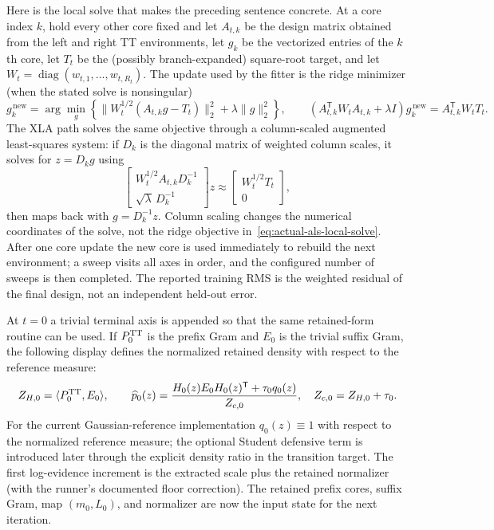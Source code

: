 \documentclass[11pt]{article}
\begin{document}
Here is the local solve that makes the preceding sentence concrete.  At a
core index $k$, hold every other core fixed and let $A_{t,k}$ be the design
matrix obtained from the left and right TT environments, let $g_k$ be the
vectorized entries of the $k$th core, let $T_t$ be the (possibly
branch-expanded) square-root target, and let
$W_t=\operatorname{diag}(w_{t,1},\ldots,w_{t,R_t})$.  The update used by the
fitter is the ridge minimizer (when the stated solve is nonsingular)
\begin{equation}
  g_k^{\,\mathrm{new}}
  =\arg\min_g\left\{
       \lVert W_t^{1/2}(A_{t,k}g-T_t)\rVert_2^2
       +\lambda\lVert g\rVert_2^2\right\},
  \qquad
  (A_{t,k}^{\mathsf T}W_tA_{t,k}+\lambda I)g_k^{\,\mathrm{new}}
  =A_{t,k}^{\mathsf T}W_tT_t.
  \label{eq:actual-als-local-solve}
\end{equation}
The XLA path solves the same objective through a column-scaled augmented
least-squares system: if $D_k$ is the diagonal matrix of weighted column
scales, it solves for $z=D_kg$ using
\[
 \begin{bmatrix}W_t^{1/2}A_{t,k}D_k^{-1}\\
                 \sqrt{\lambda}\,D_k^{-1}\end{bmatrix}z
 \approx
 \begin{bmatrix}W_t^{1/2}T_t\\0\end{bmatrix},
\]
then maps back with $g=D_k^{-1}z$.  Column scaling changes the numerical
coordinates of the solve, not the ridge objective in~\eqref{eq:actual-als-local-solve}.
After one core update the new core is used immediately to rebuild the next
environment; a sweep visits all axes in order, and the configured number of
sweeps is then completed.  The reported training RMS is the weighted residual
of the final design, not an independent held-out error.

At $t=0$ a trivial terminal axis is appended so that the same retained-form
routine can be used.  If $P_0^{\rm TT}$ is the prefix Gram and $E_0$ is the
trivial suffix Gram, the following display defines the normalized retained
density with respect to the reference measure:
\begin{equation}
  Z_{H,0}=\langle P_0^{\rm TT},E_0\rangle,
  \qquad
  \widehat p_0(z)=
  \frac{H_0(z)E_0H_0(z)^\mathsf T+\tau_0q_{0}(z)}{Z_{c,0}},
  \quad Z_{c,0}=Z_{H,0}+\tau_0.
  \label{eq:actual-initial-retention}
\end{equation}
For the current Gaussian-reference implementation $q_{0}(z)\equiv1$ with
respect to the normalized reference measure; the optional Student defensive
term is introduced later through the explicit density ratio in the transition
target.
The first log-evidence increment is the extracted scale plus the retained
normalizer (with the runner's documented floor correction).  The retained
prefix cores, suffix Gram, map $(m_0,L_0)$, and normalizer are now the input
state for the next iteration.
\end{document}
